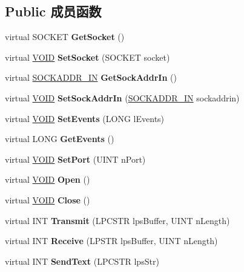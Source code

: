 \subsection*{Public 成员函数}
\begin{DoxyCompactItemize}
\item 
\mbox{\label{class_c_socket_a3863a0e164c0f2cefffbb912a113d4f9}} 
virtual S\+O\+C\+K\+ET {\bfseries Get\+Socket} ()
\item 
\mbox{\label{class_c_socket_a6b97889deb19e392ec4cfb9404cd1403}} 
virtual \hyperlink{interfacevoid}{V\+O\+ID} {\bfseries Set\+Socket} (S\+O\+C\+K\+ET socket)
\item 
\mbox{\label{class_c_socket_aa8453024f3ac487d632e915bae202a02}} 
virtual \hyperlink{structsockaddr__in}{S\+O\+C\+K\+A\+D\+D\+R\+\_\+\+IN} {\bfseries Get\+Sock\+Addr\+In} ()
\item 
\mbox{\label{class_c_socket_a3eca6e00e54e62764bad18f342f4909a}} 
virtual \hyperlink{interfacevoid}{V\+O\+ID} {\bfseries Set\+Sock\+Addr\+In} (\hyperlink{structsockaddr__in}{S\+O\+C\+K\+A\+D\+D\+R\+\_\+\+IN} sockaddrin)
\item 
\mbox{\label{class_c_socket_a8a28135f6f4e5c6114710ab1338b1eef}} 
virtual \hyperlink{interfacevoid}{V\+O\+ID} {\bfseries Set\+Events} (L\+O\+NG l\+Events)
\item 
\mbox{\label{class_c_socket_a365946461c20f431a8371dff2b0008c4}} 
virtual L\+O\+NG {\bfseries Get\+Events} ()
\item 
\mbox{\label{class_c_socket_aa4936108b402d3b73a882a61cc821354}} 
virtual \hyperlink{interfacevoid}{V\+O\+ID} {\bfseries Set\+Port} (U\+I\+NT n\+Port)
\item 
\mbox{\label{class_c_socket_aa280f84a9abd3110f529273a3b5bf082}} 
virtual \hyperlink{interfacevoid}{V\+O\+ID} {\bfseries Open} ()
\item 
\mbox{\label{class_c_socket_aa2b6615724e889119576b2789092b3f4}} 
virtual \hyperlink{interfacevoid}{V\+O\+ID} {\bfseries Close} ()
\item 
\mbox{\label{class_c_socket_a123c84f09c63f348631f8489cf49ac84}} 
virtual I\+NT {\bfseries Transmit} (L\+P\+C\+S\+TR lps\+Buffer, U\+I\+NT n\+Length)
\item 
\mbox{\label{class_c_socket_a8229a50410780509b5df0809d450a39d}} 
virtual I\+NT {\bfseries Receive} (L\+P\+S\+TR lps\+Buffer, U\+I\+NT n\+Length)
\item 
\mbox{\label{class_c_socket_a58bdb2ee6357d5cdda38986674043a32}} 
virtual I\+NT {\bfseries Send\+Text} (L\+P\+C\+S\+TR lps\+Str)
\end{DoxyCompactItemize}
